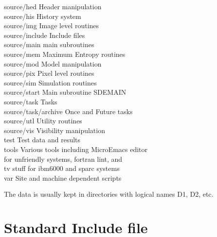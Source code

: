 \begin{tabbing}
source/hed\>                     Header manipulation\\
source/his\>                     History system\\
source/img\>                     Image level routines\\
source/include\>                 Include files\\
source/main\>                    main subroutines\\
source/mem\>                     Maximum Entropy routines\\
source/mod\>                     Model manipulation\\
source/pix\>                     Pixel level routines\\
source/sim\>                     Simulation routines\\
source/start\>                   Main subroutine SDEMAIN\\
source/task\>                    Tasks\\
source/task/archive\>            Once and Future tasks\\
source/utl\>                     Utility routines\\
source/vis\>                     Visibility manipulation\\
test\>                           Test data and results\\
tools\>                          Various tools including MicroEmacs editor\\
\>                               for unfriendly systems, fortran lint, and\\
\>                               tv stuff for ibm6000 and sparc systems\\
var\>                            Site and machine dependent scripts
\end{tabbing}

The data is usually kept in directories with logical names D1, D2, etc.

\newpage
\section{Standard Include file}

